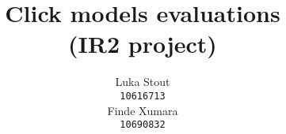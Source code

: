 \documentclass{article} %
\title{
Click models evaluations\\
\small {(IR2 project)}
}
\author{
Luka Stout\\
\texttt{10616713} \\
\And
Finde Xumara \\
\texttt{10690832} \\
}
\begin{document}
\nocite{*}
\maketitle








\clearpage

{}

\end{document}
